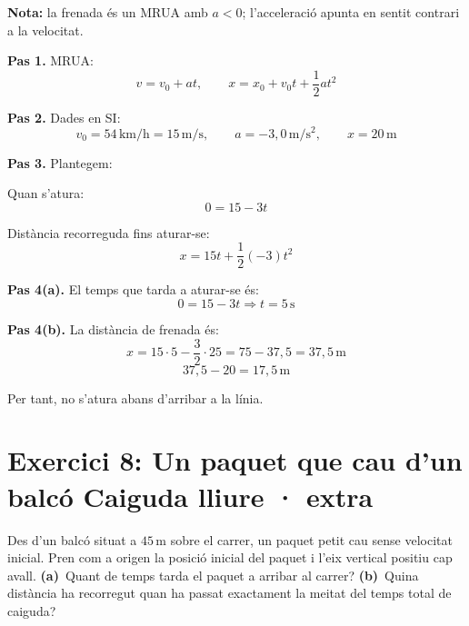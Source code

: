 \documentclass[11pt,a4paper]{article}
\begin{document}
\textbf{Nota:} la frenada és un MRUA amb $a<0$; l'acceleració apunta en sentit contrari a la velocitat.

\begin{solutionbox}
\textbf{Pas 1.} MRUA:
\[
v=v_0+at, \qquad x=x_0+v_0t+\frac{1}{2}at^2
\]

\textbf{Pas 2.} Dades en SI:
\[
v_0=54\,\mathrm{km/h}=15\,\mathrm{m/s}, \qquad a=-3{,}0\,\mathrm{m/s^2}, \qquad x=20\,\mathrm{m}
\]

\textbf{Pas 3.} Plantegem:

Quan s'atura:
\[
0=15-3t
\]

Distància recorreguda fins aturar-se:
\[
x=15t+\frac{1}{2}(-3)t^2
\]

\textbf{Pas 4(a).} El temps que tarda a aturar-se és:
\[
0=15-3t \Longrightarrow t=5\,\mathrm{s}
\]

\textbf{Pas 4(b).} La distància de frenada és:
\[
x=15\cdot 5-\frac{3}{2}\cdot 25=75-37{,}5=37{,}5\,\mathrm{m}
\]
\[
37{,}5-20=17{,}5\,\mathrm{m}
\]

Per tant, no s'atura abans d'arribar a la línia.
\end{solutionbox}

\clearpage

\section*{Exercici 8: Un paquet que cau d'un balcó \hfill \normalfont Caiguda lliure · extra}

Des d'un balcó situat a $45\,\mathrm{m}$ sobre el carrer, un paquet petit cau sense velocitat inicial. Pren com a origen la posició inicial del paquet i l'eix vertical positiu cap avall. \textbf{(a)}~Quant de temps tarda el paquet a arribar al carrer? \textbf{(b)}~Quina distància ha recorregut quan ha passat exactament la meitat del temps total de caiguda?

\begin{center}
\end{center}
\end{document}
